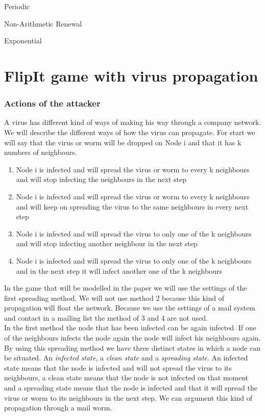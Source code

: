  \begin{description}
 \item Periodic
 \item Non-Arithmetic Renewal
 \item Exponential
 \end{description}
 
 \chapter{FlipIt game with virus propagation}
 \subsection{Actions of the attacker}
A virus has different kind of ways of making his way through a company network. We will describe the different ways of how the virus can propagate. For start we will say that the virus or worm will be dropped on Node i and that it has k numbers of neighbours. 
\begin{enumerate}
\item Node i is infected and will spread the virus or worm to every k neighbours and will stop infecting the neighbours in the next step
\item Node i is infected and will spread the virus or worm to every k neighbours and will keep on spreading the virus to the same neighbours in every next step
\item Node i is infected and will spread the virus to only one of the k neighbours and will stop infecting another neighbour in the next step
\item Node i is infected and will spread the virus to only one of the k neighbours and in the next step it will infect another one of the k neighbours 
\end{enumerate}

In the game that will be modelled in the paper we will use the settings of the first spreading method. We will not use method 2 because this kind of propagation will float the network. Because we use the settings of a mail system and contact in a mailing list the method of 3 and 4 are not used. \\
In the first method the node that has been infected can be again infected. If one of the neighbours infects the node again the node will infect his neighbours again. By using this spreading method we have three distinct states in which a node can be situated. An \textit{infected state}, a \textit{clean state} and a \textit{spreading state}. An infected state means that the node is infected and will not spread the virus to its neighbours, a clean state means that the node is not infected on that moment and a spreading state means that the node is infected and that it will spread the virus or worm to its neighbours in the next step.
We can argument this kind of propagation through a mail worm. 

